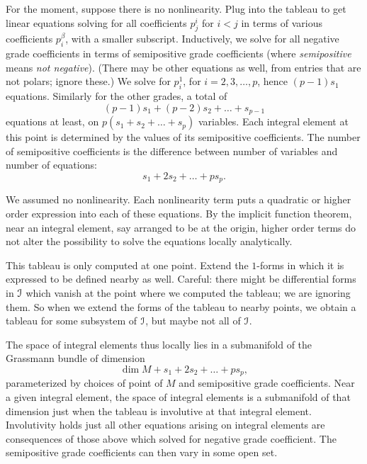 For the moment, suppose there is no nonlinearity.
Plug into the tableau to get linear equations solving for all coefficients \(p^i_j\) for \(i<j\) in terms of various coefficients \(p^{\beta}_i\), with a smaller subscript.
Inductively, we solve for all negative grade coefficients in terms of semipositive grade coefficients (where \emph{semipositive} means \emph{not negative}). 
(There may be other equations as well, from entries that are not polars; ignore these.)
We solve for \(p^1_i\), for \(i=2,3,\dots,p\), hence \((p-1)s_1\) equations.
Similarly for the other grades, a total of
\[
(p-1)s_1+(p-2)s_2+\dots+s_{p-1}
\]
equations at least, on \(p(s_1+s_2+\dots+s_p)\) variables.
Each integral element at this point is determined by the values of its semipositive coefficients.
The number of semipositive coefficients is the difference between number of variables and number of equations:
\[
s_1+2s_2+\dots+ps_p.
\]

We assumed no nonlinearity.
Each nonlinearity term puts a quadratic or higher order expression into each of these equations.
By the implicit function theorem, near an integral element, say arranged to be at the origin, higher order terms do not alter the possibility to solve the equations locally analytically.

This tableau is only computed at one point.
Extend the \(1\)-forms in which it is expressed to be defined nearby as well.
Careful: there might be differential forms in \(\mathcal{I}\) which vanish at the point where we computed the tableau; we are ignoring them.
So when we extend the forms of the tableau to nearby points, we obtain a tableau for some subsystem of \(\mathcal{I}\), but maybe not all of \(\mathcal{I}\).

The space of integral elements thus locally lies in a submanifold of the Grassmann bundle of dimension
\[
\dim M + s_1+2s_2+\dots+ps_p,
\]
parameterized by choices of point of \(M\) and semipositive grade coefficients.
Near a given integral element, the space of integral elements is a submanifold of that dimension just when the tableau is involutive at that integral element.
Involutivity holds just all other equations arising on integral elements are consequences of those above which solved for negative grade coefficient.
The semipositive grade coefficients can then vary in some open set.

